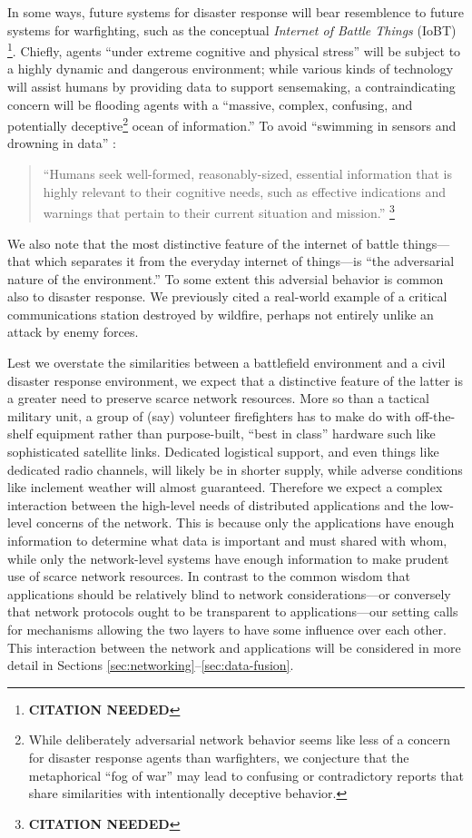 \documentclass[]             %
{NASA}                       %
\theoremstyle{definition}
\newcommand{\citationneeded}{\footnote{\textbf{CITATION NEEDED}}}
\begin{document}
In some ways, future systems for disaster response will bear
resemblence to future systems for warfighting, such as the conceptual
\emph{Internet of Battle Things} (IoBT) \citationneeded. Chiefly,
agents ``under extreme cognitive and physical stress'' will be subject
to a highly dynamic and dangerous environment; while various kinds of
technology will assist humans by providing data to support
sensemaking, a contraindicating concern will be flooding agents with a
``massive, complex, confusing, and potentially
deceptive\footnote{While deliberately adversarial network behavior
seems like less of a concern for disaster response agents than
warfighters, we conjecture that the metaphorical ``fog of war'' may
lead to confusing or contradictory reports that share similarities
with intentionally deceptive behavior.} ocean of information.'' To
avoid ``swimming in sensors and drowning in data''
\cite{2010:magnuson}:
\begin{quote}
``Humans seek well-formed, reasonably-sized, essential information
  that is highly relevant to their cognitive needs, such as effective
  indications and warnings that pertain to their current situation and
  mission.'' \citationneeded
\end{quote}
We also note that the most distinctive feature of the internet of
battle things---that which separates it from the everyday internet of
things---is ``the adversarial nature of the environment.'' To some
extent this adversial behavior is common also to disaster response. We
previously cited a real-world example of a critical communications
station destroyed by wildfire, perhaps not entirely unlike an attack
by enemy forces.

Lest we overstate the similarities between a battlefield environment
and a civil disaster response environment, we expect that a
distinctive feature of the latter is a greater need to preserve scarce
network resources. More so than a tactical military unit, a group of
(say) volunteer firefighters has to make do with off-the-shelf
equipment rather than purpose-built, ``best in class'' hardware such
like sophisticated satellite links. Dedicated logistical support, and
even things like dedicated radio channels, will likely be in shorter
supply, while adverse conditions like inclement weather will almost
guaranteed. Therefore we expect a complex interaction between the
high-level needs of distributed applications and the low-level
concerns of the network. This is because only the applications have
enough information to determine what data is important and must shared
with whom, while only the network-level systems have enough
information to make prudent use of scarce network resources. In
contrast to the common wisdom that applications should be relatively
blind to network considerations---or conversely that network protocols
ought to be transparent to applications---our setting calls for
mechanisms allowing the two layers to have some influence over each
other. This interaction between the network and applications will be
considered in more detail in Sections
\ref{sec:networking}--\ref{sec:data-fusion}.
\end{document}
